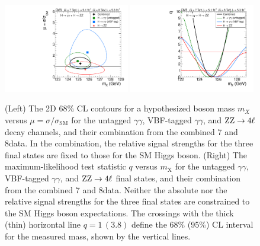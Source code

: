 \documentclass[11pt,twoside,a4paper,cmspaper,final,collab]{cms-tdr}
\begin{document}
\begin{figure} [thbp]
\centering
\includegraphics[width=0.49\textwidth]{figures/comb/sqr_mass_scan_2d_all_white} \hfill
\includegraphics[width=0.49\textwidth]{figures/comb/sqr_mass_scan_1d_all}
\caption{
(Left) The 2D 68\% CL contours for a hypothesized boson mass $m_{X}$
   versus $\mu= \sigma / \sigma_{\mathrm{SM}}$  for the untagged $\gamma \gamma$,
   VBF-tagged $\gamma \gamma$, and $\mathrm{Z}\mathrm{Z} \to 4\ell$ decay channels, and their combination from the combined
    7 and 8\TeV data.
   In the combination, the relative signal strengths for the three final states
   are fixed to those for the SM Higgs boson.
(Right) The maximum-likelihood test statistic $q$ versus $m_{\mathrm{X}}$
   for the untagged $\gamma \gamma$, VBF-tagged $\gamma \gamma$, and  $\mathrm{Z}\mathrm{Z} \to 4\ell$ final states,
   and their combination from the combined 7 and 8\TeV data.
   Neither the absolute nor the relative signal strengths for the three final states
   are constrained to the SM Higgs boson expectations.
The crossings with the thick (thin) horizontal line $q=1\,(3.8)$ define the 68\% (95\%) CL interval
for the measured mass, shown by the vertical lines.}

\label{fig:fit_mass}
\end{figure}
\end{document}
